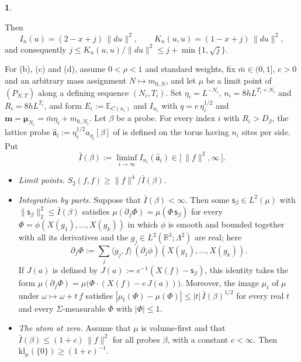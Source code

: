 \documentclass[11pt]{amsart}
\newcommand{\namedhead}{}
\theoremstyle{definition}
\newtheorem*{namedinner}{\namedhead}
\newenvironment{named}[1]{\renewcommand{\namedhead}{#1}\begin{namedinner}}{\end{namedinner}}
\begin{document}
\begin{named}{Proposition 5.6}
\begin{itemize}
Then
\begin{equation*}
I_n(u)=(2-x+j)\,\|du\|^2,\qquad K_n(u,u)=(1-x+j)\,\|du\|^2,
\end{equation*}
and consequently $j\le K_n(u,u)/\|du\|^2\le j+\min\{1,\sqrt j\}$.
\end{itemize}
For (b), (c) and (d), assume $0<\rho<1$ and standard weights, fix $\bar m\in(0,1]$, $e>0$ and an arbitrary mass assignment $N\mapsto m_{0,N}$, and let $\mu$ be a limit point of $(P_{N,T})$ along a defining sequence $(N_i,T_i)$.
Set $\eta_i=L^{-N_i}$, $n_i=8hL^{T_i+N_i}$ and $R_i=8hL^{T_i}$, and form $E_i:=\mathbb E_{C(n_i)}$ and $I_{n_i}$ with $q=e\,\eta_i^{1/2}$ and $\mathbf m=\boldsymbol\mu_{N_i}=\bar m\eta_i+m_{0,N_i}$.
Let $\beta$ be a probe.
For every index $i$ with $R_i>D_\beta$, the lattice probe $\hat{\mathfrak a}_i:=\eta_i^{1/2}a_{\eta_i}[\beta]$ of \cite[Proposition~47.1, grade~1 at $v=0$]{QEDIII} is defined on the torus having $n_i$ sites per side.
Put
\begin{equation*}
\bar I(\beta):=\liminf_{i\to\infty}I_{n_i}(\hat{\mathfrak a}_i)\in\bigl[\,\|f\|^2,\infty\,\bigr].
\end{equation*}
\begin{itemize}
\item[(b)] \emph{Limit points.}
$S_2(f,f)\ge\|f\|^4/\bar I(\beta)$.
\item[(c)] \emph{Integration by parts.}
Suppose that $\bar I(\beta)<\infty$.
Then some $\mathsf s_\beta\in L^2(\mu)$ with $\|\mathsf s_\beta\|_2^2\le\bar I(\beta)$ satisfies $\mu(\partial_f\Phi)=\mu(\Phi\,\mathsf s_\beta)$ for every $\Phi=\phi(X(g_1),\dots,X(g_k))$ in which $\phi$ is smooth and bounded together with all its derivatives and the $g_j\in L^2(\mathbb R^3;\Lambda^2)$ are real; here
\begin{equation*}
\partial_f\Phi:=\sum_j\langle g_j,f\rangle\,(\partial_j\phi)(X(g_1),\dots,X(g_k)).
\end{equation*}
If $J(a)$ is defined by $J(a):=e^{-1}(X(f)-\mathsf s_\beta)$, this identity takes the form $\mu(\partial_f\Phi)=\mu\bigl(\Phi\cdot(X(f)-e\,J(a))\bigr)$.
Moreover, the image $\mu_t$ of $\mu$ under $\omega\mapsto\omega+t\,f$ satisfies $|\mu_t(\Phi)-\mu(\Phi)|\le|t|\,\bar I(\beta)^{1/2}$ for every real $t$ and every $\Sigma$-measurable $\Phi$ with $|\Phi|\le1$.
\item[(d)] \emph{The atom at zero.}
Assume that $\mu$ is volume-first and that $\bar I(\beta)\le(1+c)\,\|f\|^2$ for all probes $\beta$, with a constant $c<\infty$.
Then $\mathrm{kl}_\mu(\{0\})\ge(1+c)^{-1}$.
\end{itemize}
\end{named}
\end{document}
